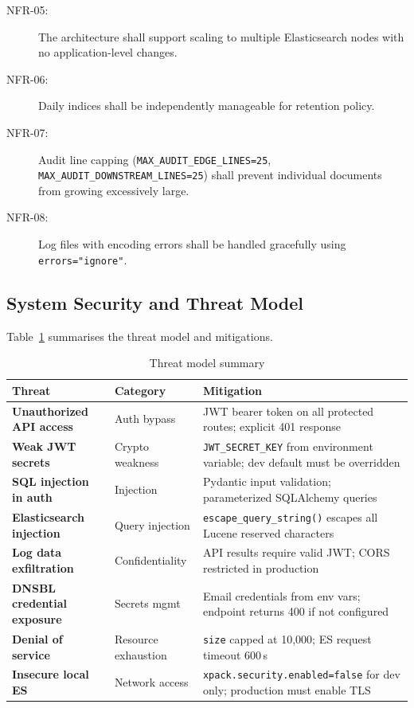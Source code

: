 \documentclass[12pt,a4paper,oneside]{report}
\newcommand{\rowA}{\rowcolor{rowgray}}
\begin{document}
\begin{description}
  \item[NFR-05:] The architecture shall support scaling to multiple Elasticsearch nodes with no application-level changes.
  \item[NFR-06:] Daily indices shall be independently manageable for retention policy.
  \item[NFR-07:] Audit line capping (\texttt{MAX\_AUDIT\_EDGE\_LINES=25}, \texttt{MAX\_AUDIT\_DOWNSTREAM\_LINES=25}) shall prevent individual documents from growing excessively large.
  \item[NFR-08:] Log files with encoding errors shall be handled gracefully using \texttt{errors="ignore"}.
\end{description}

\subsection{System Security and Threat Model}

Table~\ref{tab:threat-model} summarises the threat model and mitigations.

\begin{table}[H]
\centering
\caption{Threat model summary}
\label{tab:threat-model}
\begin{tabularx}{\textwidth}{@{}>{\bfseries}p{4.2cm} p{2.5cm} X@{}}
\toprule
Threat & Category & Mitigation \\
\midrule
\rowA Unauthorized API access & Auth bypass & JWT bearer token on all protected routes; explicit 401 response \\
Weak JWT secrets & Crypto weakness & \texttt{JWT\_SECRET\_KEY} from environment variable; dev default must be overridden \\
\rowA SQL injection in auth & Injection & Pydantic input validation; parameterized SQLAlchemy queries \\
Elasticsearch injection & Query injection & \texttt{escape\_query\_string()} escapes all Lucene reserved characters \\
\rowA Log data exfiltration & Confidentiality & API results require valid JWT; CORS restricted in production \\
DNSBL credential exposure & Secrets mgmt & Email credentials from env vars; endpoint returns 400 if not configured \\
\rowA Denial of service & Resource exhaustion & \texttt{size} capped at 10,000; ES request timeout 600\,s \\
Insecure local ES & Network access & \texttt{xpack.security.enabled=false} for dev only; production must enable TLS \\
\bottomrule
\end{tabularx}
\end{table}
\end{document}
